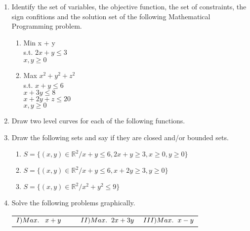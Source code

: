 \documentclass{report}
\begin{document}
\begin{enumerate}
\item Identify the set of variables, the objective function, the set of constraints, the sign confitions and the solution set of the following Mathematical Programming problem.
\begin{enumerate}
\item Min x + y \\ s.t. $2x + y \leq 3$ \\ $x, y \geq 0$
\item Max $x^2+y^2+z^2$\\ s.t. $x+y\leq 6$\\ $x+3y \leq 8$\\$x+2y+z\leq 20$\\ $x,y \geq 0$
\end{enumerate}

\item Draw two level curves for each of the following functions.\\

\item Draw the following sets and say if they are closed and/or bounded sets.
\begin{enumerate}
\item $S = \{(x,y)\in \mathbb{R}^2 / x+y \leq 6, 2x+y \geq 3, x \geq 0, y \geq 0\}$
\item $S = \{(x,y) \in \mathbb{R}^2 / x+y \leq 6, x+2y \geq 3, y \geq 0 \}$
\item $S = \{(x,y) \in \mathbb{R}^2 / x^2 + y^2 \leq 9 \}$
\end{enumerate}

\item Solve the following problems graphically.\\[0.5cm]

\centering
\begin{tabular}{|ll|l|}
\multicolumn{2}{|l|}{$ I)Max. \hspace{0.3cm}x+y \hspace{1cm} II)Max.\hspace{0.2cm} 2x+3y$} & $III)Max. \hspace{0.2cm} x-y$  \\[0.2cm]


\end{tabular}
\end{enumerate}
\end{document}
